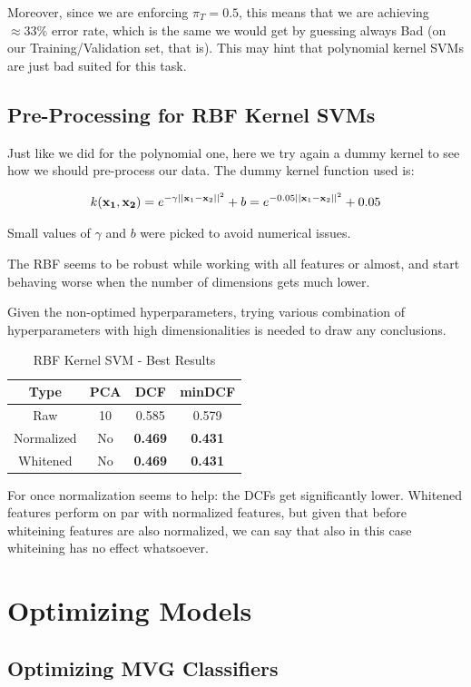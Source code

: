 \documentclass[12pt, twocolumn]{article}
\begin{document}
Moreover, since we are enforcing $\pi_T = 0.5$, this means that we are achieving $ \approx 33\% $ error rate, which is the same we would get by guessing always Bad (on our Training/Validation set, that is).
This may hint that polynomial kernel SVMs are just bad suited for this task.

\subsection{Pre-Processing for RBF Kernel SVMs}

Just like we did for the polynomial one, here we try again a dummy kernel to see how we should pre-process our data.
The dummy kernel function used is: 

$$\displaystyle k({\bf x_1}, {\bf x_2}) = e^{-\gamma||{\bf x}_1 - {\bf x}_2||^2} + b = e^{-0.05||{\bf x}_1 - {\bf x}_2||^2} + 0.05 $$

Small values of $\gamma$ and $b$ were picked to avoid numerical issues.

The RBF seems to be robust while working with all features or almost, and start behaving worse when the number of dimensions gets much lower.

Given the non-optimed hyperparameters, trying various combination of hyperparameters with high dimensionalities is needed to draw any conclusions.

\begin{table}[H]
    \centering
        \begin{tabular}{||c|c|c|c||}
            \hline
            Type & PCA & DCF & minDCF \\
            \hline
            \hline
                Raw & 10 & 0.585 &  0.579 \\ 
                Normalized & No &  {\bf 0.469}  &  {\bf 0.431} \\
                Whitened & No &  {\bf 0.469}  &  {\bf 0.431} \\
            \hline
    \end{tabular}
    \caption{RBF Kernel SVM - Best Results}
\end{table}

For once normalization seems to help: the DCFs get significantly lower. 
Whitened features perform on par with normalized features, but given that before whiteining features are also normalized, we can say that also in this case whiteining has no effect whatsoever.

\newpage
\section{Optimizing Models}
\subsection{Optimizing MVG Classifiers}
\end{document}
